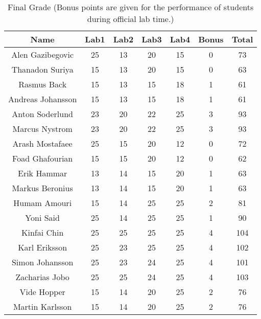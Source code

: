 \documentclass{article}
\begin{document}
\begin{table}[ht]
\caption{Final Grade (Bonus points are given for the performance of students during official lab time.)}
\centering
\begin{tabular}{c c c c c c c} 
\hline\hline 
Name & Lab1 & Lab2 & Lab3 & Lab4 & Bonus & Total \\ [0.5ex] 
\hline
Alen Gazibegovic 
& 25 & 13 & 20 & 15 & 0 & 73 \\
\hline
Thanadon Suriya 
& 15 & 13 & 20 & 15 & 0 & 63 \\
\hline
Rasmus Back 
& 15 & 13 & 15 & 18 & 1 & 61 \\
\hline 
Andreas Johansson
& 15 & 13 & 15 & 18 & 1 & 61 \\
\hline 
Anton Soderlund
& 23 & 20 & 22 & 25 & 3 & 93 \\
\hline 
Marcus Nystrom
& 23 & 20 & 22 & 25 & 3 & 93 \\
\hline
Arash Mostafaee
& 25 & 15 & 20 & 12 & 0 & 72 \\
\hline
Foad Ghafourian
& 15 & 15 & 20 & 12 & 0 & 62 \\
\hline
Erik Hammar
& 13 & 14 & 15 & 20 & 1 & 63 \\
\hline
Markus Beronius
& 13 & 14 & 15 & 20 & 1 & 63 \\
\hline 
Humam Amouri
& 15 & 14 & 25 & 25 & 2 & 81 \\
\hline 
Yoni Said
& 25 & 14 & 25 & 25 & 1 & 90 \\  
\hline
Kinfai Chin
& 25 & 25 & 25 & 25 & 4 & 104 \\
\hline
Karl Eriksson
& 25 & 23 & 25 & 25 & 4 & 102 \\ 
\hline
Simon Johansson
& 25 & 23 & 24 & 25 & 4 & 101 \\
\hline
Zacharias Jobo
& 25 & 25 & 24 & 25 & 4 & 103 \\
\hline
Vide Hopper
& 15 & 14 & 20 & 25 & 2 & 76 \\ [1ex]
\hline
Martin Karlsson
& 15 & 14 & 20 & 25 & 2 & 76 \\
\hline
\end{tabular}
\label{table:nonlin}
\end{table}
\end{document}
